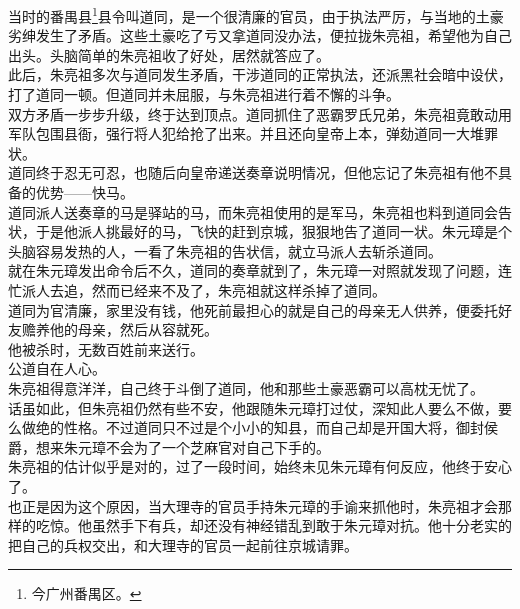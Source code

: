 \begin{multicols}{\theparacolNo}
当时的番禺县\footnote{今广州番禺区。}县令叫道同，是一个很清廉的官员，由于执法严厉，与当地的土豪劣绅发生了矛盾。这些土豪吃了亏又拿道同没办法，便拉拢朱亮祖，希望他为自己出头。头脑简单的朱亮祖收了好处，居然就答应了。\\

此后，朱亮祖多次与道同发生矛盾，干涉道同的正常执法，还派黑社会暗中设伏，打了道同一顿。但道同并未屈服，与朱亮祖进行着不懈的斗争。\\

双方矛盾一步步升级，终于达到顶点。道同抓住了恶霸罗氏兄弟，朱亮祖竟敢动用军队包围县衙，强行将人犯给抢了出来。并且还向皇帝上本，弹劾道同一大堆罪状。\\

道同终于忍无可忍，也随后向皇帝递送奏章说明情况，但他忘记了朱亮祖有他不具备的优势——快马。\\

道同派人送奏章的马是驿站的马，而朱亮祖使用的是军马，朱亮祖也料到道同会告状，于是他派人挑最好的马，飞快的赶到京城，狠狠地告了道同一状。朱元璋是个头脑容易发热的人，一看了朱亮祖的告状信，就立马派人去斩杀道同。\\

就在朱元璋发出命令后不久，道同的奏章就到了，朱元璋一对照就发现了问题，连忙派人去追，然而已经来不及了，朱亮祖就这样杀掉了道同。\\

道同为官清廉，家里没有钱，他死前最担心的就是自己的母亲无人供养，便委托好友赡养他的母亲，然后从容就死。\\

他被杀时，无数百姓前来送行。\\

公道自在人心。\\

朱亮祖得意洋洋，自己终于斗倒了道同，他和那些土豪恶霸可以高枕无忧了。\\

话虽如此，但朱亮祖仍然有些不安，他跟随朱元璋打过仗，深知此人要么不做，要么做绝的性格。不过道同只不过是个小小的知县，而自己却是开国大将，御封侯爵，想来朱元璋不会为了一个芝麻官对自己下手的。\\

朱亮祖的估计似乎是对的，过了一段时间，始终未见朱元璋有何反应，他终于安心了。\\

也正是因为这个原因，当大理寺的官员手持朱元璋的手谕来抓他时，朱亮祖才会那样的吃惊。他虽然手下有兵，却还没有神经错乱到敢于朱元璋对抗。他十分老实的把自己的兵权交出，和大理寺的官员一起前往京城请罪。\\


\end{multicols}
